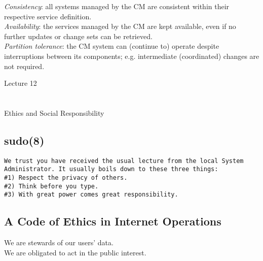 \documentclass[xga]{xdvislides}
\begin{document}
{\em Consistency}: all systems managed by the CM are
consistent within their respective service definition.
\\

{\em Availability}: the services managed by the CM are
kept available, even if no further updates or change
sets can be retrieved. \\

{\em Partition tolerance}: the CM system can (continue
to) operate despite interruptions between its
components; e.g. intermediate (coordinated) changes
are not required.

\newpage
\vspace*{\fill}
\begin{center}
    \Hugesize
        Lecture 12 \\ [1em]
    \hspace*{5mm}
    \blueline\\
    \hspace*{5mm}\\
	Ethics and Social Responsibility
\end{center}
\vspace*{\fill}

\subsection{sudo(8)}
\vspace*{\fill}
\begin{verbatim}
We trust you have received the usual lecture from the local System
Administrator. It usually boils down to these three things:
#1) Respect the privacy of others.
#2) Think before you type.
#3) With great power comes great responsibility.
\end{verbatim}
\vspace*{\fill}

\subsection{A Code of Ethics in Internet Operations}
\Huge
\vspace*{\fill}
\begin{center}

We are stewards of our users' data. \\

We are obligated to act in the public interest.

\end{center}
\vspace*{\fill}
\Normalsize
\end{document}
